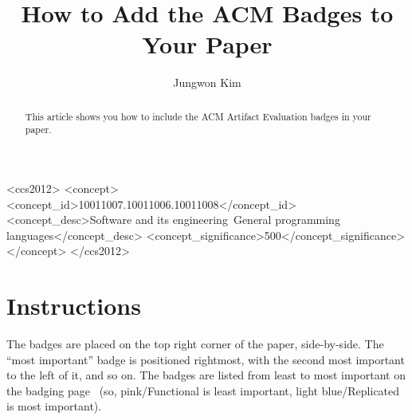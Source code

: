 \documentclass[sigplan]{acmart}
\begin{document}
\title{How to Add the ACM Badges to Your Paper}

\author{Jungwon Kim}

\begin{abstract}
This article shows you how to include the ACM Artifact Evaluation badges in your paper.
\end{abstract}

\begin{CCSXML}
<ccs2012>
<concept>
<concept_id>10011007.10011006.10011008</concept_id>
<concept_desc>Software and its engineering~General programming languages</concept_desc>
<concept_significance>500</concept_significance>
</concept>
</ccs2012>
\end{CCSXML}



\maketitle

\BgThispage

\section{Instructions}
The badges are placed on the top right corner of the paper, side-by-side. The “most important” badge is positioned rightmost, with the second most important to the left of it, and so on. The badges are listed from least to most important on the badging page~\cite{ACM} (so, pink/Functional is least important, light blue/Replicated is most important).



\end{document}
